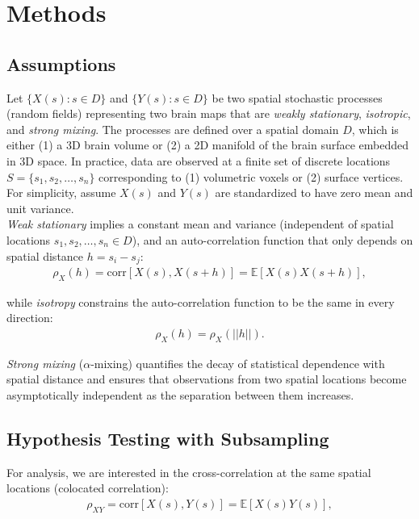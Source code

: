 \documentclass[9pt]{article}
\begin{document}
\section{Methods}
\subsection{Assumptions}

Let $\{X(s): s\in D\}$ and $\{Y(s): s\in D\}$ be two spatial stochastic processes (random fields) representing two brain maps that are \textit{weakly stationary}, \textit{isotropic}, and \textit{strong mixing}. The processes are defined over a spatial domain $D$, which is either (1) a 3D brain volume or (2) a 2D manifold of the brain surface embedded in 3D space. In practice, data are observed at a finite set of discrete locations $S = \{s_1, s_2, \dots, s_n\}$ corresponding to (1) volumetric voxels or (2) surface vertices. For simplicity, assume $X(s)$ and $Y(s)$ are standardized to have zero mean and unit variance.\\

\textit{Weak stationary} implies a constant mean and variance (independent of spatial locations $s_1, s_2, \dots, s_n \in D$), and an auto-correlation function that only depends on spatial distance $h = s_i - s_j$:
\begin{align}
    \rho_X(h) = \text{corr}[X(s), X(s+h)] = \mathbb{E}[X(s) X(s+h)],
\end{align}

\noindent while \textit{isotropy} constrains the auto-correlation function to be the same in every direction:
\begin{align}
    \rho_X(h) = \rho_X(||h||).
\end{align}

\noindent \textit{Strong mixing} ($\alpha$-mixing) quantifies the decay of statistical dependence with spatial distance and ensures that observations from two spatial locations become asymptotically independent as the separation between them increases.\\


\subsection{Hypothesis Testing with Subsampling}

For analysis, we are interested in the cross-correlation at the same spatial locations (colocated correlation):
\begin{align}
    \rho_{XY} = \text{corr}[X(s), Y(s)] = \mathbb{E}[X(s) Y(s)],
\end{align}
\end{document}
